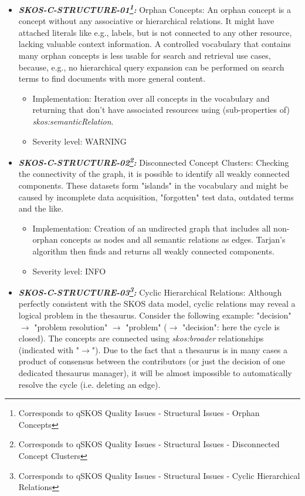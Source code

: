 \documentclass{llncs}
\begin{document}
\begin{itemize}
	\item \textbf{{\em SKOS-C-STRUCTURE-01\footnote{Corresponds to qSKOS Quality Issues - Structural Issues - Orphan Concepts}:}}
	Orphan Concepts:
  An orphan concept is a concept without any associative or hierarchical relations. It might have attached literals like e.g., labels, but is not connected to any other resource, lacking valuable context information. A controlled vocabulary that contains many orphan concepts is less usable for search and retrieval use cases, because, e.g., no hierarchical query expansion can be performed on search terms to find documents with more general content. 
	\begin{itemize}
		\item Implementation: Iteration over all concepts in the vocabulary and returning that don't have associated resources using (sub-properties of) \emph{skos:semanticRelation}. 
		\item Severity level: WARNING
\end{itemize}
	\item \textbf{{\em SKOS-C-STRUCTURE-02\footnote{Corresponds to qSKOS Quality Issues - Structural Issues - Disconnected Concept Clusters}:}}
	Disconnected Concept Clusters:
	Checking the connectivity of the graph, it is possible to identify all weakly connected components. These datasets form "islands" in the vocabulary and might be caused by incomplete data acquisition, "forgotten" test data, outdated terms and the like. 
	\begin{itemize}
		\item Implementation: Creation of an undirected graph that includes all non-orphan concepts as nodes and all semantic relations as edges. Tarjan's algorithm then finds and returns all weakly connected components.
		\item Severity level: INFO
\end{itemize}
	\item \textbf{{\em SKOS-C-STRUCTURE-03\footnote{Corresponds to qSKOS Quality Issues - Structural Issues - Cyclic Hierarchical Relations}:}}
	Cyclic Hierarchical Relations: 
	Although perfectly consistent with the SKOS data model, cyclic relations may reveal a logical problem in the thesaurus. Consider the following example: "decision" $\rightarrow$ "problem resolution" $\rightarrow$ "problem" ($\rightarrow$ "decision": here the cycle is closed). The concepts are connected using \emph{skos:broader} relationships (indicated with "$\rightarrow$"). Due to the fact that a thesaurus is in many cases a product of consensus between the contributors (or just the decision of one dedicated thesaurus manager), it will be almost impossible to automatically resolve the cycle (i.e. deleting an edge). 

\end{itemize}
\end{document}
